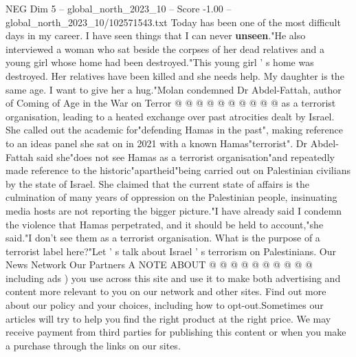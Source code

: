 \begin{textsample}{NEG Dim 5 – global\_north\_2023\_10 – Score -1.00 – global\_north\_2023\_10/102571543.txt}
Today has been one of the most difficult days in my career.
I have seen things that I can never \textbf{unseen}."He also interviewed a woman who sat beside the corpses of her dead relatives and a young girl whose home had been destroyed."This young girl ' s home was destroyed.
Her relatives have been killed and she needs help.
My daughter is the same age.
I want to give her a hug."Molan condemned Dr Abdel-Fattah, author of Coming of Age in the War on Terror @ @ @ @ @ @ @ @ @ @ as a terrorist organisation, leading to a heated exchange over past atrocities dealt by Israel.
She called out the academic for"defending Hamas in the past", making reference to an ideas panel she sat on in 2021 with a known Hamas"terrorist".
Dr Abdel-Fattah said she"does not see Hamas as a terrorist organisation"and repeatedly made reference to the historic"apartheid"being carried out on Palestinian civilians by the state of Israel.
She claimed that the current state of affairs is the culmination of many years of oppression on the Palestinian people, insinuating media hosts are not reporting the bigger picture."I have already said I condemn the violence that Hamas perpetrated, and it should be held to account,"she said."I don't see them as a terrorist organisation.
What is the purpose of a terrorist label here?"Let ' s talk about Israel ' s terrorism on Palestinians.
Our News Network Our Partners A NOTE ABOUT @ @ @ @ @ @ @ @ @ @ including ads ) you use across this site and use it to make both advertising and content more relevant to you on our network and other sites.
Find out more about our policy and your choices, including how to opt-out.Sometimes our articles will try to help you find the right product at the right price.
We may receive payment from third parties for publishing this content or when you make a purchase through the links on our sites.

\end{textsample}
